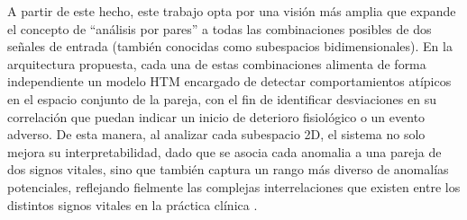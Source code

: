 A partir de este hecho, este trabajo opta por una visión más amplia que expande el concepto de “análisis por pares” a todas las combinaciones posibles de dos señales de entrada (también conocidas como subespacios bidimensionales). En la arquitectura propuesta, cada una de estas combinaciones alimenta de forma independiente un modelo HTM encargado de detectar comportamientos atípicos en el espacio conjunto de la pareja, con el fin de identificar desviaciones en su correlación que puedan indicar un inicio de deterioro fisiológico o un evento adverso. De esta manera, al analizar cada subespacio 2D, el sistema no solo mejora su interpretabilidad, dado que se asocia cada anomalia a una pareja de dos signos vitales, sino que también captura un rango más diverso de anomalías potenciales, reflejando fielmente las complejas interrelaciones que existen entre los distintos signos vitales en la práctica clínica \parencite{Pieroni2023}.
